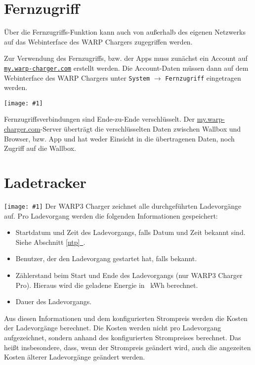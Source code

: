 \documentclass[a4paper,10pt]{article}
\newcommand{\hint}[1]{\begin{tcolorbox}[colback=boxgray,colframe=black,coltext=
white,title=Hinweis,left*=2mm,right*=2mm,boxsep=1mm,bottom=1mm,top=1mm]#1\end{tcolorbox}}
\newcommand{\gfx}[1]{\texttt{[image: \#1]}}
\newcommand*{\fullref}[1]{Abschnitt \hyperref[{#1}]{\ref*{#1}~\nameref*{#1}}}
\newcommand\rurl[2]{%
  \href{#1}{\nolinkurl{#2}}%
}
\begin{document}
\begin{multicols*}{2}
    \vfill
    \null
    \columnbreak

    \section{Fernzugriff}

    Über die Fernzugriffs-Funktion kann auch von außerhalb des eigenen Netzwerks auf das Webinterface des WARP Chargers zugegriffen werden.

    Zur Verwendung des Fernzugriffs, bzw. der Apps muss zunächst ein Account auf \rurl{https://my.warp-charger.com}{my.warp-charger.com} erstellt werden. Die Account-Daten müssen dann auf dem Webinterface des WARP Chargers unter \texttt{System} $\rightarrow$ \texttt{Fernzugriff} eingetragen werden.

    \gfx{./img_warp3/resized/web_remote_access}

    \hint{Fernzugriffsverbindungen sind Ende-zu-Ende verschlüsselt. Der \url{my.warp-charger.com}-Server überträgt die verschlüsselten Daten zwischen Wallbox und Browser, bzw. App und hat weder Einsicht in die übertragenen Daten, noch Zugriff auf die Wallbox.}

    \vfill
    \null
    \columnbreak

    \section{Ladetracker}\label{charge_tracker}
    \gfx{./img_warp3/resized/web_charge_tracker}
    Der WARP3 Charger zeichnet alle durchgeführten Ladevorgänge auf. Pro Ladevorgang werden die folgenden Informationen gespeichert:
    \begin{itemize}
     \item Startdatum und Zeit des Ladevorgangs, falls Datum und Zeit bekannt
     sind. Siehe \fullref{ntp}.
     \item Benutzer, der den Ladevorgang gestartet hat, falls bekannt.
     \item Zählerstand beim Start und Ende des Ladevorgangs (nur WARP3 Charger Pro). Hieraus wird die geladene Energie in \SI{}{\kWh} berechnet.
     \item Dauer des Ladevorgangs.
    \end{itemize}
    Aus diesen Informationen und dem konfigurierten Strompreis werden die Kosten der Ladevorgänge berechnet. Die Kosten werden nicht pro Ladevorgang aufgezeichnet, sondern anhand des konfigurierten Strompreises berechnet. Das heißt insbesondere, dass, wenn der Strompreis geändert wird, auch die angezeiten Kosten älterer Ladevorgänge geändert werden.


\end{multicols*}
\end{document}
